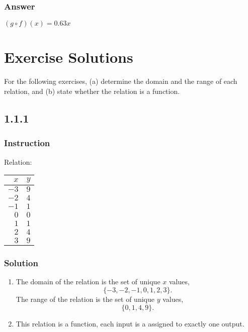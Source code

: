 \documentclass[12pt, letterpaper, oneside]{memoir}
\begin{document}
\subsubsection{Answer}

$ (g \circ f)(x) = 0.63x $

\section*{Exercise Solutions}

For the following exercises, (a) determine the domain and the range of each relation, and (b) state whether the relation is a function.

\subsection*{1.1.1}

\subsubsection{Instruction}

Relation:

\begin{table}[h]
  \begin{tabular}{ r r }
    \hline
    $ x $ & $ y $ \\
    \hline
    $ -3 $ & $ 9 $ \\
    $ -2 $ & $ 4 $ \\
    $ -1 $ & $ 1 $ \\
    $ 0 $ & $ 0 $ \\
    $ 1 $ & $ 1 $ \\
    $ 2 $ & $ 4 $ \\
    $ 3 $ & $ 9 $ \\
    \hline
  \end{tabular}
\end{table}

\subsubsection{Solution}

\begin{enumerate}[label=(\alph*)]
  \item The domain of the relation is the set of unique $ x $ values,
    $$ \phantom{.}
    \{ -3, -2, -1, 0, 1, 2, 3 \}
    .$$
    The range of the relation is the set of unique $ y $ values,
    $$ \phantom{.}
    \{ 0, 1, 4, 9 \}
    .$$
  \item This relation is a function, each input is a assigned to exactly one output.
\end{enumerate}
\end{document}
